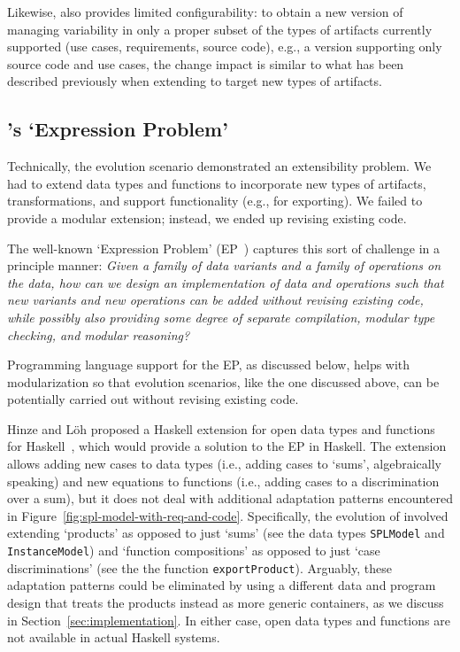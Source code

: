 Likewise, \hp{} also provides limited configurability: to obtain a new
version of \hp{} managing variability in only a proper subset of the
types of artifacts currently supported (use cases, requirements,
source code), e.g., a version supporting only source code and use
cases, the change impact is similar to what has been described
previously when extending \hp{} to target new types of artifacts.


\subsection{\hp's `Expression Problem'}
\label{S:xp}

Technically, the evolution scenario demonstrated an extensibility
problem. We had to extend data types and functions to incorporate new
types of artifacts, transformations, and support functionality (e.g., for
exporting). We failed to provide a modular extension; instead, we
ended up revising existing code.

The well-known `Expression Problem'
(EP~\cite{Wadler98,Lopez-HerrejonBC05}) captures this sort of
challenge in a principle manner: \emph{Given a family of data variants
  and a family of operations on the data, how can we design an
  implementation of data and operations such that new variants and new
  operations can be added without revising existing code, while
  possibly also providing some degree of separate compilation, modular
  type checking, and modular reasoning?}

Programming language support for the EP, as discussed below, helps
with modularization so that evolution scenarios, like the one
discussed above, can be potentially carried out without revising
existing code.

Hinze and L\"oh proposed a Haskell extension for open data types and
functions for Haskell~\cite{LoehH06}, which would provide a solution
to the EP in Haskell. The extension allows adding new cases to data
types (i.e., adding cases to `sums', algebraically speaking) and new
equations to functions (i.e., adding cases to a discrimination over a
sum), but it does not deal with additional adaptation patterns
encountered in
Figure~\ref{fig:spl-model-with-req-and-code}. Specifically, the
evolution of \hp{} involved extending `products' as opposed to just
`sums' (see the data types \texttt{SPLModel} and
\texttt{InstanceModel}) and `function compositions' as opposed to just
`case discriminations' (see the the function \texttt{exportProduct}).
Arguably, these adaptation patterns could be eliminated by using a
different data and program design that treats the products instead as
more generic containers, as we discuss in
Section~\ref{sec:implementation}. In either case, open data types and
functions are not available in actual Haskell systems.

